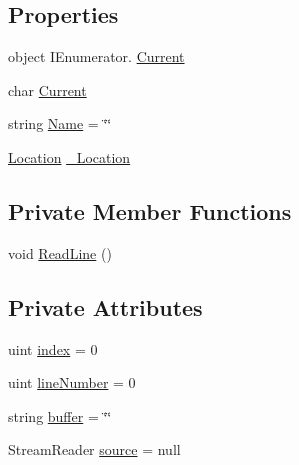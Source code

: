\subsection*{Properties}
\begin{DoxyCompactItemize}
\item 
object I\+Enumerator. \mbox{\hyperlink{class_compiler_1_1_source_file_a4a0d8f66b3c7de70edadb1761aaf65b5}{Current}}
\item 
char \mbox{\hyperlink{class_compiler_1_1_source_file_a2d009621871245dfb64d3866ece03633}{Current}}
\item 
string \mbox{\hyperlink{class_compiler_1_1_source_file_a0e304ca0e3d5b0af3dd18d09520f215e}{Name}} = \char`\"{}\char`\"{}
\item 
\mbox{\hyperlink{class_compiler_1_1_location}{Location}} \mbox{\hyperlink{class_compiler_1_1_source_file_a9f6feacf9e20b5b1d535c712d9b4370e}{\+\_\+\+Location}}
\end{DoxyCompactItemize}
\subsection*{Private Member Functions}
\begin{DoxyCompactItemize}
\item 
void \mbox{\hyperlink{class_compiler_1_1_source_file_a4e9f67bce62e15431b753705a79097ad}{Read\+Line}} ()
\end{DoxyCompactItemize}
\subsection*{Private Attributes}
\begin{DoxyCompactItemize}
\item 
uint \mbox{\hyperlink{class_compiler_1_1_source_file_a46a2996b918f0b2f795449879663cfe5}{index}} = 0
\item 
uint \mbox{\hyperlink{class_compiler_1_1_source_file_a9fea4fc4a3640f2f88db7d2e8be3db70}{line\+Number}} = 0
\item 
string \mbox{\hyperlink{class_compiler_1_1_source_file_a6ac27509abd78029bf3881636983ab48}{buffer}} = \char`\"{}\char`\"{}
\item 
Stream\+Reader \mbox{\hyperlink{class_compiler_1_1_source_file_a46db9fe024d4cf1e282e6afafea8c4b2}{source}} = null
\end{DoxyCompactItemize}


